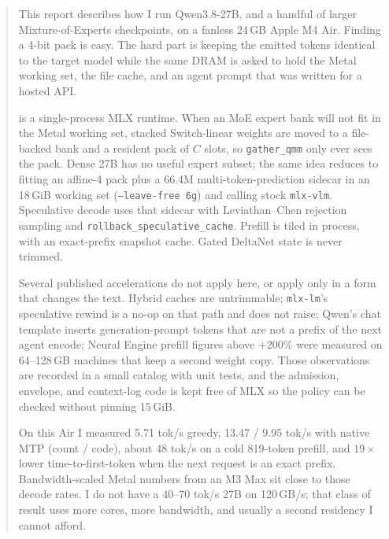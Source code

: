 \author{
Andre Heid\\
Yale University\\
\texttt{andre.h.costa@yale.edu}
}

\date{2 September 2026 \\[0.3em] \small Technical report (companion to \texttt{main.tex}, the conference extract)}


\maketitle
\thispagestyle{fancy}

\begin{abstract}
This report describes how I run Qwen3.8-27B, and a handful of larger Mixture-of-Experts checkpoints, on a fanless 24\,GB Apple M4 Air. Finding a 4-bit pack is easy. The hard part is keeping the emitted tokens identical to the target model while the same DRAM is asked to hold the Metal working set, the file cache, and an agent prompt that was written for a hosted API.

\slotbank{} is a single-process MLX runtime. When an MoE expert bank will not fit in the Metal working set, stacked Switch-linear weights are moved to a file-backed bank and a resident pack of $C$ slots, so \texttt{gather\_qmm} only ever sees the pack. Dense 27B has no useful expert subset; the same idea reduces to fitting an affine-4 pack plus a 66.4M multi-token-prediction sidecar in an 18\,GiB working set (\texttt{--leave-free 6g}) and calling stock \texttt{mlx-vlm}. Speculative decode uses that sidecar with Leviathan--Chen rejection sampling and \texttt{rollback\_speculative\_cache}. Prefill is tiled in process, with an exact-prefix snapshot cache. Gated DeltaNet state is never trimmed.

Several published accelerations do not apply here, or apply only in a form that changes the text. Hybrid caches are untrimmable; \texttt{mlx-lm}'s speculative rewind is a no-op on that path and does not raise; Qwen's chat template inserts generation-prompt tokens that are not a prefix of the next agent encode; Neural Engine prefill figures above ${+}200\%$ were measured on 64--128\,GB machines that keep a second weight copy. Those observations are recorded in a small catalog with unit tests, and the admission, envelope, and context-log code is kept free of MLX so the policy can be checked without pinning 15\,GiB.

On this Air I measured 5.71 tok/s greedy, 13.47 / 9.95 tok/s with native MTP (count / code), about 48 tok/s on a cold 819-token prefill, and $19\times$ lower time-to-first-token when the next request is an exact prefix. Bandwidth-scaled Metal numbers from an M3 Max sit close to those decode rates. I do not have a 40--70 tok/s 27B on 120\,GB/s; that class of result uses more cores, more bandwidth, and usually a second residency I cannot afford.


\end{abstract}
